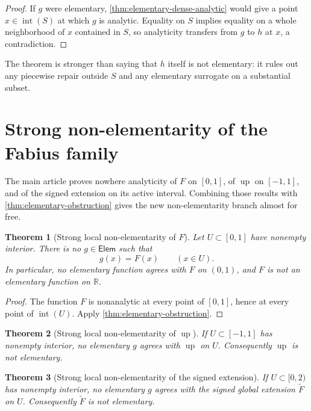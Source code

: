 \documentclass[11pt,oneside]{article}
\newtheorem{theorem}{Theorem}[section]
\theoremstyle{definition}
\theoremstyle{remark}
\newcommand{\R}{\mathbb R}
\newcommand{\Up}{\operatorname{up}}
\newcommand{\interior}{\operatorname{int}}
\begin{document}
\begin{proof}
If $g$ were elementary, \cref{thm:elementary-dense-analytic} would give a point
$x\in\interior(S)$ at which $g$ is analytic.  Equality on $S$ implies equality on a whole
neighborhood of $x$ contained in $S$, so analyticity transfers from $g$ to $h$ at $x$, a
contradiction.
\end{proof}

The theorem is stronger than saying that $h$ itself is not elementary: it rules out any
piecewise repair outside $S$ and any elementary surrogate on a substantial subset.

\section{Strong non-elementarity of the Fabius family}
\label{sec:not-elementary}

The main article proves nowhere analyticity of $F$ on $[0,1]$, of $\Up$ on $[-1,1]$, and of
the signed extension on its active interval.  Combining those results with
\cref{thm:elementary-obstruction} gives the new non-elementarity branch almost for free.

\begin{theorem}[Strong local non-elementarity of $F$]
\label{thm:fabius-strong-non-elementary}
Let $U\subset[0,1]$ have nonempty interior.  There is no $g\in\mathsf{Elem}$ such that
\begin{equation}
 g(x)=F(x)\qquad(x\in U).
 \label{eq:elementary-F-agreement}
\end{equation}
In particular, no elementary function agrees with $F$ on $(0,1)$, and $F$ is not an
elementary function on $\R$.
\end{theorem}

\begin{proof}
The function $F$ is nonanalytic at every point of $[0,1]$, hence at every point of
$\interior(U)$.  Apply \cref{thm:elementary-obstruction}.
\end{proof}

\begin{theorem}[Strong local non-elementarity of $\Up$]
\label{thm:up-strong-non-elementary}
If $U\subset[-1,1]$ has nonempty interior, no elementary $g$ agrees with $\Up$ on $U$.
Consequently $\Up$ is not elementary.
\end{theorem}

\begin{theorem}[Strong local non-elementarity of the signed extension]
\label{thm:global-strong-non-elementary}
If $U\subset[0,2)$ has nonempty interior, no elementary $g$ agrees with the signed global
extension $\widetilde F$ on $U$.  Consequently $\widetilde F$ is not elementary.
\end{theorem}
\end{document}
